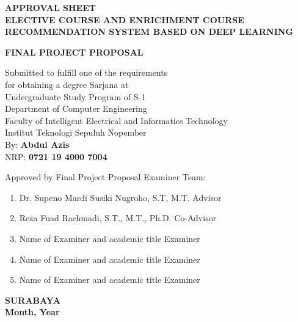 \begin{center}
    \uppercase{\textbf{\large Approval Sheet}} \\

    \vspace*{15mm}
    \uppercase{\textbf{Elective Course and Enrichment course recommendation system based on Deep Learning}}
    \vspace*{15mm}

    \uppercase{\textbf{Final Project Proposal}}

    \vspace*{3mm}
    Submitted to fulfill one of the requirements                  \\
    \vspace*{3mm}
    for obtaining a degree Sarjana at                             \\
    \vspace*{3mm}
    Undergraduate Study Program of S-1                            \\
    \vspace*{3mm}
    Department of Computer Engineering                            \\
    \vspace*{3mm}
    Faculty of Intelligent Electrical and Informatics Technology  \\
    \vspace*{3mm}
    Institut Teknologi Sepuluh Nopember                           \\

    \vspace*{1.5cm}
    By: \textbf{Abdul Azis}                                       \\
    \vspace*{3mm}
    NRP: \textbf{0721 19 4000 7004}                               \\
    \vspace*{1.5cm}

    Approved by Final Project Proposal Examiner Team:             \\
    \vspace*{5mm}

    \begin{enumerate}
        \setlength\itemsep{1.5em}
        \item Dr. Supeno Mardi Susiki Nugroho, S.T, M.T. \hfill Advisor
        \item Reza Fuad Rachmadi, S.T., M.T., Ph.D. \hfill Co-Advisor
        \item Name of Examiner and academic title \hfill Examiner
        \item Name of Examiner and academic title \hfill Examiner
        \item Name of Examiner and academic title \hfill Examiner
    \end{enumerate}

    \vspace*{1.5cm}
    \uppercase{\textbf{surabaya}}                      \\
    \textbf{Month, Year}                               \\

\end{center}